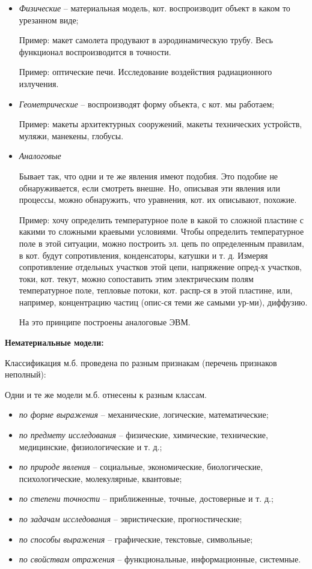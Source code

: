 \begin{itemize}[label*=--]
	\item \textit{Физические} -- материальная модель, кот. воспроизводит объект в каком то урезанном виде;
	
	Пример: макет  самолета продувают в аэродинамическую трубу. Весь функционал воспроизводится в точности.
	
	Пример: оптические печи. Исследование воздействия радиационного излучения.
	
	\item \textit{Геометрические} -- воспроизводят форму объекта, с кот. мы работаем;
	
	Пример: макеты архитектурных сооружений, макеты технических устройств, муляжи, манекены, глобусы.
	
	\item \textit{Аналоговые}
	
	Бывает так, что одни и те же явления имеют подобия. Это подобие не обнаруживается, если смотреть внешне. Но, описывая эти явления или процессы, можно обнаружить, что 
	уравнения, кот. их описывают, похожие.
	
	Пример: хочу определить температурное поле в какой то сложной пластине с какими то сложными краевыми условиями. Чтобы определить температурное поле в этой ситуации, можно построить эл. цепь по определенным правилам, в кот. будут сопротивления, конденсаторы, катушки и т. д.
	Измеряя сопротивление отдельных участков этой цепи, напряжение опред-х участков, токи, кот. текут, можно сопоставить этим электрическим полям температурное поле, тепловые потоки, кот. распр-ся в этой пластине, или, например, концентрацию частиц (опис-ся теми же самыми ур-ми), диффузию.
	
	На это принципе построены аналоговые ЭВМ.
\end{itemize}


\textbf{Нематериальные модели:}

Классификация м.б. проведена по разным признакам (перечень признаков неполный): 

Одни и те же модели м.б. отнесены к разным классам.

\begin{itemize}[label*=--]
	\item \textit{по форме выражения} -- механические, логические, математические;
	\item \textit{по предмету исследования} -- физические, химические, технические, медицинские, физиологические и т. д.;
	\item \textit{по природе явления} -- социальные, экономические, биологические, психологические, молекулярные, квантовые;
	\item \textit{по степени точности} -- приближенные, точные, достоверные и т. д.;
	\item \textit{по задачам исследования} -- эвристические, прогностические;
	\item \textit{по способы выражения} -- графические, текстовые, символьные;
	\item \textit{по свойствам отражения} -- функциональные, информационные, системные.
\end{itemize}



